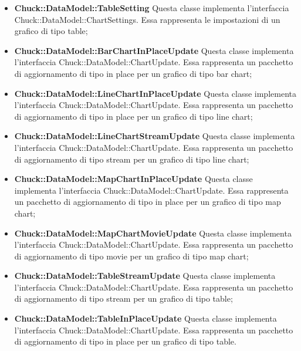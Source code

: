 \begin{itemize}
		\item \textbf{Chuck::DataModel::TableSetting} Questa classe implementa l'interfaccia \linebreak Chuck::DataModel::ChartSettings. Essa rappresenta le impostazioni di un grafico di tipo table;

		\item \textbf{Chuck::DataModel::BarChartInPlaceUpdate} Questa classe implementa l'interfaccia Chuck::DataModel::ChartUpdate. Essa rappresenta un pacchetto di aggiornamento di tipo in place per un grafico di tipo bar chart;

		\item \textbf{Chuck::DataModel::LineChartInPlaceUpdate} Questa classe implementa l'interfaccia Chuck::DataModel::ChartUpdate. Essa rappresenta un pacchetto di aggiornamento di tipo in place per un grafico di tipo line chart;

		\item \textbf{Chuck::DataModel::LineChartStreamUpdate} Questa classe implementa l'interfaccia Chuck::DataModel::ChartUpdate. Essa rappresenta un pacchetto di aggiornamento di tipo stream per un grafico di tipo line chart;

		\item \textbf{Chuck::DataModel::MapChartInPlaceUpdate} Questa classe implementa l'interfaccia Chuck::DataModel::ChartUpdate. Essa rappresenta un pacchetto di aggiornamento di tipo in place per un grafico di tipo map chart;

		\item \textbf{Chuck::DataModel::MapChartMovieUpdate} Questa classe implementa l'interfaccia Chuck::DataModel::ChartUpdate. Essa rappresenta un pacchetto di aggiornamento di tipo movie per un grafico di tipo map chart;

		\item \textbf{Chuck::DataModel::TableStreamUpdate} Questa classe implementa l'interfaccia Chuck::DataModel::ChartUpdate. Essa rappresenta un pacchetto di aggiornamento di tipo stream per un grafico di tipo table;

		\item \textbf{Chuck::DataModel::TableInPlaceUpdate} Questa classe implementa l'interfaccia Chuck::DataModel::ChartUpdate. Essa rappresenta un pacchetto di aggiornamento di tipo in place per un grafico di tipo table.
	\end{itemize}
